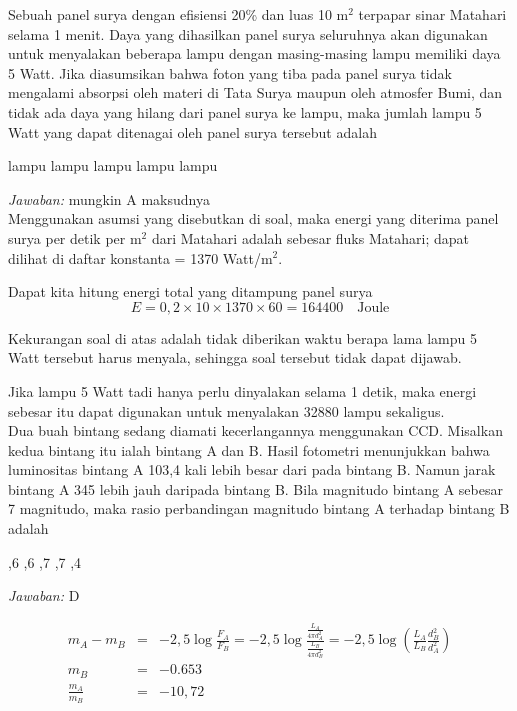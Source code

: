 \documentclass[11pt,fleqn]{exam}
\begin{document}
\begin{questions}
\question Sebuah panel surya dengan efisiensi 20\% dan luas 10 m$^2$ terpapar sinar Matahari selama 1 menit. Daya yang dihasilkan panel surya seluruhnya akan digunakan untuk menyalakan beberapa lampu dengan masing-masing lampu memiliki daya 5 Watt. Jika diasumsikan bahwa foton yang tiba pada panel surya tidak mengalami absorpsi oleh materi di Tata Surya maupun oleh atmosfer Bumi, dan tidak ada daya yang hilang dari panel surya ke lampu, maka jumlah lampu 5 Watt yang dapat ditenagai oleh panel surya tersebut adalah
\begin{choices}
 lampu
 lampu
 lampu
 lampu
 lampu
\end{choices}

\textit{Jawaban: } mungkin A maksudnya\\

Menggunakan asumsi yang disebutkan di soal, maka energi yang diterima panel surya per detik per m$^2$ dari Matahari adalah sebesar fluks Matahari; dapat dilihat di daftar konstanta = 1370 Watt/m$^2$. 

Dapat kita hitung energi total yang ditampung panel surya
\begin{equation*}
E = 0,2 \times 10 \times 1370 \times 60 = 164400 \quad \text{Joule}
\end{equation*}

Kekurangan soal di atas adalah tidak diberikan waktu berapa lama lampu 5 Watt tersebut harus menyala, sehingga soal tersebut tidak dapat dijawab. 

Jika lampu 5 Watt tadi hanya perlu dinyalakan selama 1 detik, maka energi sebesar itu dapat digunakan untuk menyalakan 32880 lampu sekaligus.\\

\question Dua buah bintang sedang diamati kecerlangannya menggunakan CCD. Misalkan kedua bintang itu ialah bintang A dan B. Hasil fotometri menunjukkan bahwa luminositas bintang A 103,4 kali lebih besar dari pada bintang B. Namun jarak bintang A 345 lebih jauh daripada bintang B. Bila magnitudo bintang A sebesar 7 magnitudo, maka rasio perbandingan magnitudo bintang A terhadap bintang B adalah
\begin{choices}
,6
,6
,7
,7
,4
\end{choices}

\textit{Jawaban: } D

\begin{eqnarray*}
m_A - m_B &=& -2,5 \log{\frac{F_A}{F_B}} = -2,5 \log{\frac{\frac{L_A}{4\pi d_A^2}}{\frac{L_B}{4 \pi d_B^2}}} = -2,5 \log{\left(\frac{L_A}{L_B} \frac{d_B^2}{d_A^2}\right)}\\
m_B &=& -0.653\\
\frac{m_A}{m_B} &=& -10,72\\ 
\end{eqnarray*}



\end{questions}
\end{document}
